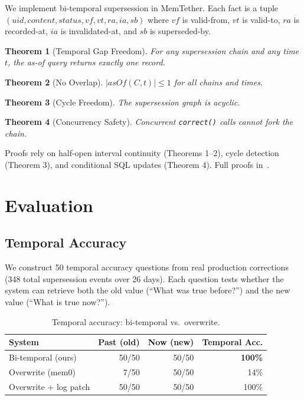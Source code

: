 \documentclass{article}
\newtheorem{theorem}{Theorem}
\begin{document}
We implement bi-temporal supersession in MemTether. Each fact is a tuple $(\mathit{uid}, \mathit{content}, \mathit{status}, \mathit{vf}, \mathit{vt}, \mathit{ra}, \mathit{ia}, \mathit{sb})$ where $\mathit{vf}$ is valid-from, $\mathit{vt}$ is valid-to, $\mathit{ra}$ is recorded-at, $\mathit{ia}$ is invalidated-at, and $\mathit{sb}$ is superseded-by.

\begin{theorem}[Temporal Gap Freedom]
For any supersession chain and any time $t$, the as-of query returns exactly one record.
\end{theorem}

\begin{theorem}[No Overlap]
$|\mathit{asOf}(C, t)| \leq 1$ for all chains and times.
\end{theorem}

\begin{theorem}[Cycle Freedom]
The supersession graph is acyclic.
\end{theorem}

\begin{theorem}[Concurrency Safety]
Concurrent \texttt{correct()} calls cannot fork the chain.
\end{theorem}

Proofs rely on half-open interval continuity (Theorems 1--2), cycle detection (Theorem 3), and conditional SQL updates (Theorem 4). Full proofs in~\cite{memtether}.

\section{Evaluation}
\label{sec:eval}

\subsection{Temporal Accuracy}
\label{sec:temporal}

We construct 50 temporal accuracy questions from real production corrections (348 total supersession events over 26 days). Each question tests whether the system can retrieve both the old value (``What was true before?'') and the new value (``What is true now?'').

\begin{table}[h]
\centering
\caption{Temporal accuracy: bi-temporal vs.\ overwrite.}
\begin{tabular}{lrrr}
\toprule
System & Past (old) & Now (new) & Temporal Acc. \\
\midrule
Bi-temporal (ours) & 50/50 & 50/50 & \textbf{100\%} \\
Overwrite (mem0) & 7/50 & 50/50 & 14\% \\
Overwrite + log patch & 50/50 & 50/50 & 100\% \\
\bottomrule
\end{tabular}
\label{tab:temporal}
\end{table}
\end{document}
